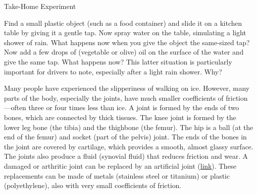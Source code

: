 \documentclass[
]{book}
\newenvironment{note}{}{}
\begin{document}
\hypertarget{fs-id1528330}{}
\begin{note}

Take-Home Experiment

Find a small plastic object (such as a food container) and slide it on a
kitchen table by giving it a gentle tap. Now spray water on the table,
simulating a light shower of rain. What happens now when you give the
object the same-sized tap? Now add a few drops of (vegetable or olive)
oil on the surface of the water and give the same tap. What happens now?
This latter situation is particularly important for drivers to note,
especially after a light rain shower. Why?

\end{note}

Many people have experienced the slipperiness of walking on ice.
However, many parts of the body, especially the joints, have much
smaller coefficients of friction---often three or four times less than
ice. A joint is formed by the ends of two bones, which are connected by
thick tissues. The knee joint is formed by the lower leg bone (the
tibia) and the thighbone (the femur). The hip is a ball (at the end of
the femur) and socket (part of the pelvis) joint. The ends of the bones
in the joint are covered by cartilage, which provides a smooth, almost
glassy surface. The joints also produce a fluid (synovial fluid) that
reduces friction and wear. A damaged or arthritic joint can be replaced
by an artificial joint
(\protect\hyperlink{import-auto-id1165296217318}{link}). These
replacements can be made of metals (stainless steel or titanium) or
plastic (polyethylene), also with very small coefficients of friction.
\end{document}
